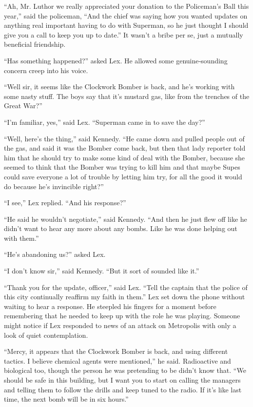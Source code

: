 \documentclass[ebook,12pt]{memoir}
\begin{document}
``Ah, Mr. Luthor we really appreciated your donation to the Policeman's
Ball this year,'' said the policeman, ``And the chief was saying how you
wanted updates on anything real important having to do with Superman, so
he just thought I should give you a call to keep you up to date.'' It
wasn't a bribe per se, just a mutually beneficial friendship.

``Has something happened?'' asked Lex. He allowed some genuine‐sounding
concern creep into his voice.

``Well sir, it seems like the Clockwork Bomber is back, and he's working
with some nasty stuff. The boys say that it's mustard gas, like from the
trenches of the Great War?''

``I'm familiar, yes,'' said Lex. ``Superman came in to save the day?''

``Well, here's the thing,'' said Kennedy. ``He came down and pulled
people out of the gas, and said it was the Bomber come back, but then
that lady reporter told him that he should try to make some kind of deal
with the Bomber, because she seemed to think that the Bomber was trying
to kill him and that maybe Supes could save everyone a lot of trouble by
letting him try, for all the good it would do because he's invincible
right?''

``I see,'' Lex replied. ``And his response?''

``He said he wouldn't negotiate,'' said Kennedy. ``And then he just flew
off like he didn't want to hear any more about any bombs. Like he was
done helping out with them.''

``He's abandoning us?'' asked Lex.

``I don't know sir,'' said Kennedy. ``But it sort of sounded like it.''

``Thank you for the update, officer,'' said Lex. ``Tell the captain that
the police of this city continually reaffirm my faith in them.'' Lex set
down the phone without waiting to hear a response. He steepled his
fingers for a moment before remembering that he needed to keep up with
the role he was playing. Someone might notice if Lex responded to news
of an attack on Metropolis with only a look of quiet contemplation.

``Mercy, it appears that the Clockwork Bomber is back, and using
different tactics. I believe chemical agents were mentioned,'' he said.
Radioactive and biological too, though the person he was pretending to
be didn't know that. ``We should be safe in this building, but I want
you to start on calling the managers and telling them to follow the
drills and keep tuned to the radio. If it's like last time, the next
bomb will be in six hours.''
\end{document}

